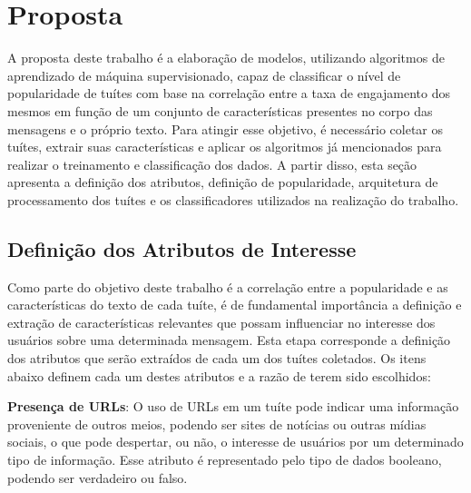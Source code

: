 \documentclass[oneside,openright,12pt]{ufsm_2015} %
\begin{document}

\chapter{Proposta}
\label{sec:proposta}

    \par A proposta deste trabalho é a elaboração de modelos, utilizando algoritmos de aprendizado de máquina supervisionado, capaz de classificar o nível de popularidade de tuítes com base na correlação entre a taxa de engajamento dos mesmos em função de um conjunto de características presentes no corpo das mensagens e o próprio texto. Para atingir esse objetivo, é necessário coletar os tuítes, extrair suas características e aplicar os algoritmos já mencionados para realizar o treinamento e classificação dos dados. A partir disso, esta seção apresenta a definição dos atributos, definição de popularidade, arquitetura de processamento dos tuítes e os classificadores utilizados na realização do trabalho.


\section{Definição dos Atributos de Interesse}
\label{sec:def-atributos}

    \par Como parte do objetivo deste trabalho é a correlação entre a popularidade e as características do texto de cada tuíte, é de fundamental importância a definição e extração de características relevantes que possam influenciar no interesse dos usuários sobre uma determinada mensagem. Esta etapa corresponde a definição dos atributos que serão extraídos de cada um dos tuítes coletados. Os itens abaixo definem cada um destes atributos e a razão de terem sido escolhidos:

    \par \textbf{Presença de URLs}: O uso de URLs em um tuíte pode indicar uma informação proveniente de outros meios, podendo ser sites de notícias ou outras mídias sociais, o que pode despertar, ou não, o interesse de usuários por um determinado tipo de informação. Esse atributo é representado pelo tipo de dados booleano, podendo ser verdadeiro ou falso.
\end{document}
